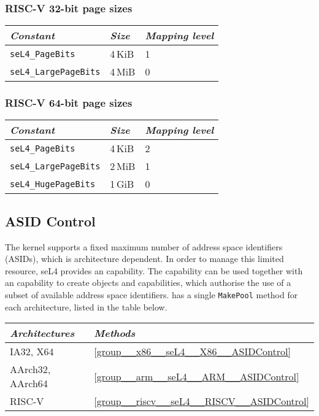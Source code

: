 \subsubsection{RISC-V 32-bit page sizes}

\begin{tabularx}{\textwidth}{Xll} \toprule
    \emph{Constant}             & \emph{Size} & \emph{Mapping level} \\ \midrule
    \texttt{seL4\_PageBits}      & 4\,KiB      & 1                   \\
    \texttt{seL4\_LargePageBits} & 4\,MiB      & 0                   \\
    \bottomrule
\end{tabularx}

\subsubsection{RISC-V 64-bit page sizes}

\begin{tabularx}{\textwidth}{Xll} \toprule
    \emph{Constant}             & \emph{Size} & \emph{Mapping level} \\ \midrule
    \texttt{seL4\_PageBits}      & 4\,KiB      & 2                   \\
    \texttt{seL4\_LargePageBits} & 2\,MiB      & 1                   \\
    \texttt{seL4\_HugePageBits}  & 1\,GiB      & 0                   \\
    \bottomrule
\end{tabularx}

\subsection{ASID Control}

The kernel supports a fixed maximum number of address space identifiers (ASIDs), which is
architecture dependent. In order to manage this limited resource, seL4 provides an  capability. The  capability can be used together with an 
capability to create  objects and capabilities, which authorise the use of a subset
of available address space identifiers.  has a single \texttt{MakePool} method for
each architecture, listed in the table below.

\begin{tabularx}{\textwidth}{Xl} \toprule
\emph{Architectures} & \emph{Methods} \\ \midrule
IA32, X64            & \autoref{group__x86__seL4__X86__ASIDControl} \\
AArch32, AArch64     & \autoref{group__arm__seL4__ARM__ASIDControl} \\
RISC-V               & \autoref{group__riscv__seL4__RISCV__ASIDControl} \\
\bottomrule
\end{tabularx}

